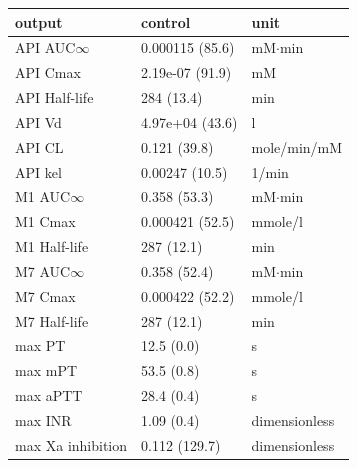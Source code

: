 \begin{tabular}{lll}
\toprule
output & control & unit \\
\midrule
API AUC$\infty$ & 0.000115 (85.6) & mM$\cdot$min \\
API Cmax & 2.19e-07 (91.9) & mM \\
API Half-life & 284 (13.4) & min \\
API Vd & 4.97e+04 (43.6) & l \\
API CL & 0.121 (39.8) & mole/min/mM \\
API kel & 0.00247 (10.5) & 1/min \\
M1 AUC$\infty$ & 0.358 (53.3) & mM$\cdot$min \\
M1 Cmax & 0.000421 (52.5) & mmole/l \\
M1 Half-life & 287 (12.1) & min \\
M7 AUC$\infty$ & 0.358 (52.4) & mM$\cdot$min \\
M7 Cmax & 0.000422 (52.2) & mmole/l \\
M7 Half-life & 287 (12.1) & min \\
max PT & 12.5 (0.0) & s \\
max mPT & 53.5 (0.8) & s \\
max aPTT & 28.4 (0.4) & s \\
max INR & 1.09 (0.4) & dimensionless \\
max Xa inhibition & 0.112 (129.7) & dimensionless \\
\bottomrule
\end{tabular}
